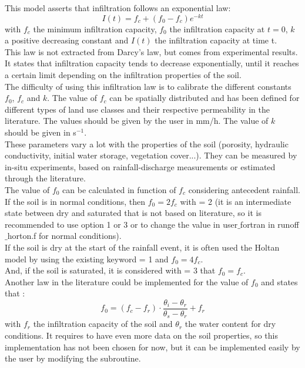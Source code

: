 This model asserts that infiltration follows an exponential law:
\begin{equation}
  I(t)=f_c+(f_0-f_c)e^{-kt}
\end{equation}
with $f_c$ the minimum infiltration capacity, $f_0$ the infiltration capacity at
$t=0$, $k$ a positive decreasing constant  and $I(t)$ the infiltration capacity at time t. \\
This law is not extracted from Darcy's law, but comes from experimental results.
It states that infiltration capacity tends to decrease exponentially, until it
reaches a certain limit depending on the infiltration properties of the soil.\\
The difficulty of using this infiltration law is to calibrate the different
constants $f_0$, $f_c$ and $k$.
The value of $f_c$ can be spatially distributed and has been defined for
different types of land use classes and their respective permeability in the literature.
The values should be given by the user in mm/h. The value of $k$ should be given
in s$^{-1}$.\\
These parameters vary a lot with the properties of the soil (porosity, hydraulic
conductivity, initial water storage, vegetation cover...).
They can be measured by in-situ experiments, based on rainfall-discharge
measurements or estimated through the literature. \\
The value of $f_{0}$ can be calculated in function of $f_c$ considering
antecedent rainfall.
If the soil is in normal conditions, then $f_0=2 f_c$ with
 = 2 (it is an intermediate state between
dry and saturated that is not based on literature, so it is recommended to use
option 1 or 3 or to change the value in user$\_$fortran in runoff$\_$horton.f
for normal conditions). \\
If the soil is dry at the start of the rainfall event, it is often used the
Holtan model by  using the existing keyword
 = 1 and $f_0=4 f_c$.\\
And, if the soil is saturated, it is considered with
 = 3 that $f_0=f_c$.\\

Another law in the literature could be implemented for the value of $f_{0}$ and states that :
\begin{equation}
  f_{0}=(f_c-f_r)\cdot\frac{\theta_i-\theta_r}{\theta_s-\theta_r}+f_r
\end{equation}
with $f_{r}$ the infiltration capacity of the soil and $\theta_{r}$ the water
content for dry conditions.
It requires to have even more data on the soil properties, so this implementation
has not been chosen for now, but it can be implemented easily by the user by
modifying the subroutine.

